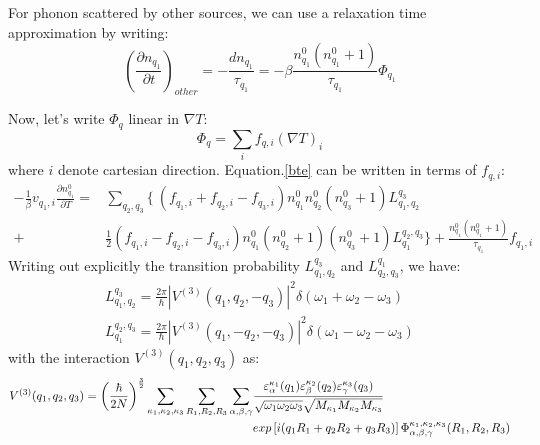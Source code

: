 \documentclass{article}
\newcommand{\pfrac}[2]{\frac{\partial #1}{\partial #2}}
\begin{document}
For phonon scattered by other sources, we can use a relaxation time approximation by writing:
\begin{equation}
    \left( \pfrac{n_{q_1}}{t} \right)_{other} = - \frac{dn_{q_1}}{\tau_{q_1}} = -\beta \frac{n_{q_1}^0(n_{q_1}^0+1)}{\tau_{q_1}} \Phi_{q_1}
\end{equation}

Now, let's write $\Phi_q$ linear in $\nabla T$:
\begin{equation}
    \Phi_q = \sum_i f_{q,i} \left( \nabla T \right)_i
\end{equation}
where $i$ denote cartesian direction. Equation.\ref{bte} can be written in terms of $f_{q,i}$:
\begin{align}
    - \frac{1}{\beta} v_{q_1,i} \pfrac{n_{q_1}^0}{T} =& \sum_{q_2,q_3} 
    \{\ \left( f_{q_1,i} + f_{q_2,i} - f_{q_3,i} \right) n_{q_1}^0 n_{q_2}^0 (n_{q_3}^0 + 1) L_{q_1,q_2}^{q_3} \\
      + &\frac{1}{2}\left( f_{q_1,i} - f_{q_2,i} - f_{q_3,i} \right) n_{q_1}^0 (n_{q_2}^0+1) (n_{q_3}^0 + 1) L^{q_2,q_3}_{q_1} \} 
      + \frac{n_{q_1}^0(n_{q_1}^0+1)}{\tau_{q_1}} f_{q_1,i}\label{bte2}
\end{align}
Writing out explicitly the transition probability $L_{q_1,q_2}^{q_3}$ and $L_{q_2,q_3}^{q_1}$, we have:
\begin{gather}
    L_{q_1,q_2}^{q_3} = \frac{2\pi}{\hbar}|V^{(3)}(q_1, q_2, -q_3)|^2 \delta(\omega_1 + \omega_2 - \omega_3) \\
    L^{q_2,q_3}_{q_1} = \frac{2\pi}{\hbar}|V^{(3)}(q_1, -q_2, -q_3)|^2 \delta(\omega_1 - \omega_2 - \omega_3)
\end{gather}
with the interaction $V^{(3)}(q_1, q_2, q_3)$ as:
\begin{align}
    V^{(3)}(q_1, q_2, q_3) = \left( \frac{\hbar}{2N} \right)^{\frac{3}{2}} 
                \sum_{\kappa_1,\kappa_2,\kappa_3} \sum_{R_1,R_2,R_3} \sum_{\alpha, \beta, \gamma} &
                \frac{\varepsilon^{\kappa_1}_\alpha(q_1)\varepsilon^{\kappa_2}_\beta(q_2)\varepsilon^{\kappa_3}_\gamma(q_3) }
                { \sqrt{\omega_1 \omega_2 \omega_3} \sqrt{M_{\kappa_1}M_{\kappa_2}M_{\kappa_3}} } \notag \\
             &exp \left[ i(q_1 R_1 + q_2 R_2 + q_3 R_3 ) \right] \Phi_{\alpha, \beta, \gamma}^{\kappa_1,\kappa_2,\kappa_3} (R_1,R_2,R_3)
\end{align}
\end{document}
